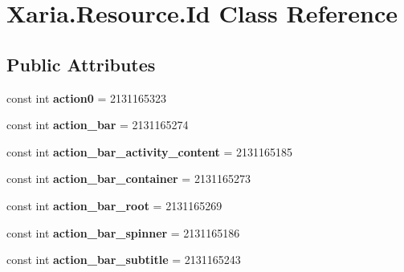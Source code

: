\hypertarget{classXaria_1_1Resource_1_1Id}{}\section{Xaria.\+Resource.\+Id Class Reference}
\label{classXaria_1_1Resource_1_1Id}
\subsection*{Public Attributes}
\begin{DoxyCompactItemize}
\item 
\mbox{\label{classXaria_1_1Resource_1_1Id_a51292548daedb95223f8aa3ea2b260cb}} 
const int {\bfseries action0} = 2131165323
\item 
\mbox{\label{classXaria_1_1Resource_1_1Id_a1d35139354c212c8411e60e4c3571b78}} 
const int {\bfseries action\+\_\+bar} = 2131165274
\item 
\mbox{\label{classXaria_1_1Resource_1_1Id_a37fb66de19a4d31b7169304f15a972b9}} 
const int {\bfseries action\+\_\+bar\+\_\+activity\+\_\+content} = 2131165185
\item 
\mbox{\label{classXaria_1_1Resource_1_1Id_a4355cc5abb49e8fbdc5ed8994ad3bf3b}} 
const int {\bfseries action\+\_\+bar\+\_\+container} = 2131165273
\item 
\mbox{\label{classXaria_1_1Resource_1_1Id_adbf6789c6d62de54f808ee9791a143e2}} 
const int {\bfseries action\+\_\+bar\+\_\+root} = 2131165269
\item 
\mbox{\label{classXaria_1_1Resource_1_1Id_a2b042e45b738c38680ef91efd440693d}} 
const int {\bfseries action\+\_\+bar\+\_\+spinner} = 2131165186
\item 
\mbox{\label{classXaria_1_1Resource_1_1Id_a1c82a837052476f31afa7933faa96599}} 
const int {\bfseries action\+\_\+bar\+\_\+subtitle} = 2131165243
\item 
\mbox{\label{classXaria_1_1Resource_1_1Id_ab5c26e768743c96b962bf00b5287e05e}} 

\end{DoxyCompactItemize}
